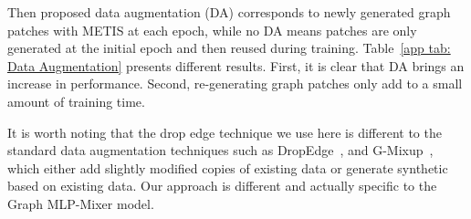 \documentclass{article}
\begin{document}
Then proposed data augmentation (DA) corresponds to newly generated graph patches with METIS at each epoch, while no DA means patches are only generated at the initial epoch and then reused during training. Table~\ref{app tab: Data Augmentation} presents different results. First, it is clear that DA brings an increase in performance. Second, re-generating graph patches only add to a small amount of training time. 

It is worth noting that the drop edge technique we use here is different to the standard data augmentation techniques such as DropEdge~\citep{rong2019dropedge}, and G-Mixup~\citep{han2022gmixup}, which either add slightly modified copies of existing data or generate synthetic based on existing data. Our approach is different and actually specific to the Graph MLP-Mixer model.
\end{document}
